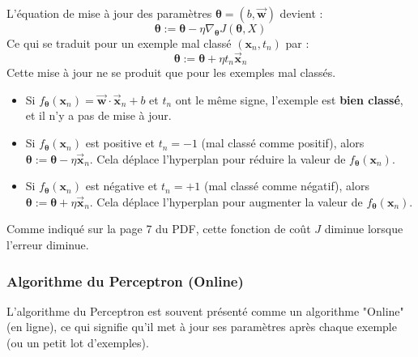 \documentclass{article}
\begin{document}
L'équation de mise à jour des paramètres $\mathbf{\theta} = (b, \mathbf{\vec{w}})$ devient :
$$\mathbf{\theta} := \mathbf{\theta} - \eta \nabla_\mathbf{\theta} J(\mathbf{\theta}, X)$$
Ce qui se traduit pour un exemple mal classé $(\mathbf{x}_n, t_n)$ par :
$$\mathbf{\theta} := \mathbf{\theta} + \eta t_n \mathbf{\vec{x}}_n$$
Cette mise à jour ne se produit que pour les exemples mal classés.
\begin{itemize}
    \item Si $f_\mathbf{\theta}(\mathbf{x}_n) = \mathbf{\vec{w}} \cdot \mathbf{\vec{x}}_n + b$ et $t_n$ ont le même signe, l'exemple est \textbf{bien classé}, et il n'y a pas de mise à jour.
    \item Si $f_\mathbf{\theta}(\mathbf{x}_n)$ est positive et $t_n = -1$ (mal classé comme positif), alors $\mathbf{\theta} := \mathbf{\theta} - \eta \mathbf{\vec{x}}_n$. Cela déplace l'hyperplan pour réduire la valeur de $f_\mathbf{\theta}(\mathbf{x}_n)$.
    \item Si $f_\mathbf{\theta}(\mathbf{x}_n)$ est négative et $t_n = +1$ (mal classé comme négatif), alors $\mathbf{\theta} := \mathbf{\theta} + \eta \mathbf{\vec{x}}_n$. Cela déplace l'hyperplan pour augmenter la valeur de $f_\mathbf{\theta}(\mathbf{x}_n)$.
\end{itemize}
Comme indiqué sur la page 7 du PDF, cette fonction de coût $J$ diminue lorsque l'erreur diminue.

\subsubsection{Algorithme du Perceptron (Online)}
L'algorithme du Perceptron est souvent présenté comme un algorithme "Online" (en ligne), ce qui signifie qu'il met à jour ses paramètres après chaque exemple (ou un petit lot d'exemples).
\end{document}
